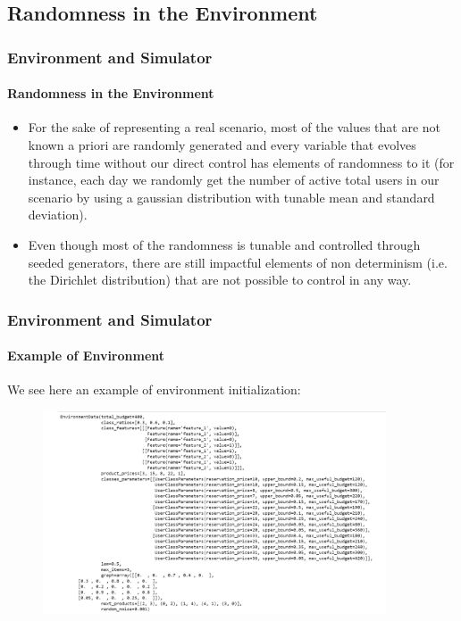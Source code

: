 \documentclass[11pt]{beamer}
\begin{document}

\subsection{Randomness in the Environment}


\begin{frame}

\frametitle{Environment and Simulator}
\framesubtitle{Randomness in the Environment}

\begin{itemize}[leftmargin=*, label={$\circ$}]
    \item For the sake of representing a real scenario, most of the values that are not known a priori are randomly generated and every variable that evolves through time without our direct control has elements of randomness to it (for instance, each day we randomly get the number of active total users in our scenario by using a gaussian distribution with tunable mean and standard deviation).
    \item Even though most of the randomness is tunable and controlled through seeded generators, there are still impactful elements of non determinism (i.e. the Dirichlet distribution) that are not possible to control in any way.
\end{itemize}

\end{frame}


\begin{frame}

\frametitle{Environment and Simulator}
\framesubtitle{Example of Environment}

We see here an example of environment initialization:
\begin{figure}[<t>]
    \includegraphics[height=6cm]{img/Graphs/Example_environment.png}
\end{figure}

\end{frame}
\end{document}
